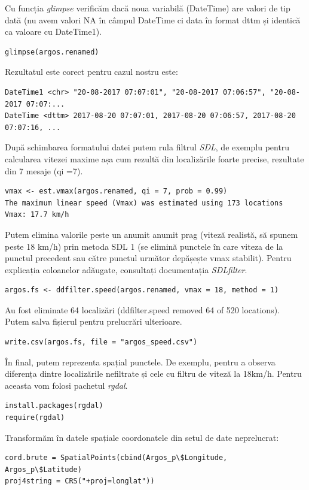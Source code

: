 \documentclass[11pt,onehalfspacing]{elife}
\begin{document}
Cu funcția \textit{glimpse} verificăm dacă noua variabilă (DateTime) are valori de tip dată (nu avem valori NA în câmpul DateTime ci data în format dttm și identică ca valoare cu DateTime1).
\begin{lstlisting}
glimpse(argos.renamed)
\end{lstlisting}

Rezultatul este corect pentru cazul nostru este:
\begin{lstlisting}
DateTime1 <chr> "20-08-2017 07:07:01", "20-08-2017 07:06:57", "20-08-2017 07:07:...
DateTime <dttm> 2017-08-20 07:07:01, 2017-08-20 07:06:57, 2017-08-20 07:07:16, ...
\end{lstlisting}

După schimbarea formatului datei putem rula filtrul \textit{SDL}, de exemplu pentru calcularea vitezei maxime așa cum rezultă din localizările foarte precise, rezultate din 7 mesaje (qi =7).
\begin{lstlisting}
vmax <- est.vmax(argos.renamed, qi = 7, prob = 0.99)
The maximum linear speed (Vmax) was estimated using 173 locations
Vmax: 17.7 km/h
\end{lstlisting}

Putem elimina valorile peste un anumit anumit prag (viteză realistă, să spunem peste 18 km/h) prin metoda SDL 1 (se elimină punctele în care viteza de la punctul precedent sau către punctul următor depășește vmax stabilit). Pentru explicația coloanelor adăugate, consultați documentația \textit{SDLfilter}.
\begin{lstlisting}
argos.fs <- ddfilter.speed(argos.renamed, vmax = 18, method = 1)
\end{lstlisting}

Au fost eliminate 64 localizări (ddfilter.speed removed 64 of 520 locations).
Putem salva fișierul pentru prelucrări ulterioare.
\begin{lstlisting}
write.csv(argos.fs, file = "argos_speed.csv")
\end{lstlisting}

În final, putem reprezenta spațial punctele. De exemplu, pentru a observa diferența dintre localizările nefiltrate și cele cu filtru de viteză la 18km/h. Pentru aceasta vom folosi pachetul \textit{rgdal}.

\begin{lstlisting}
install.packages(rgdal)
require(rgdal)
\end{lstlisting}

Transformăm în datele spațiale coordonatele din setul de date neprelucrat:
\begin{lstlisting}
cord.brute = SpatialPoints(cbind(Argos_p\$Longitude, Argos_p\$Latitude)
proj4string = CRS("+proj=longlat"))
\end{lstlisting}
\end{document}
